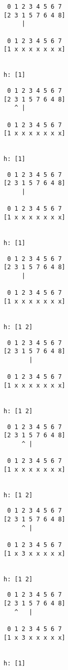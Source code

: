 { \begin{verbatim}
 0 1 2 3 4 5 6 7
[2 3 1 5 7 6 4 8]
     |

 0 1 2 3 4 5 6 7
[1 x x x x x x x]


h: [1]
\end{verbatim} }

{ \begin{verbatim}
 0 1 2 3 4 5 6 7
[2 3 1 5 7 6 4 8]
   ^ |

 0 1 2 3 4 5 6 7
[1 x x x x x x x]


h: [1]
\end{verbatim} }

{ \begin{verbatim}
 0 1 2 3 4 5 6 7
[2 3 1 5 7 6 4 8]
     |

 0 1 2 3 4 5 6 7
[1 x x x x x x x]


h: [1]
\end{verbatim} }

{ \begin{verbatim}
 0 1 2 3 4 5 6 7
[2 3 1 5 7 6 4 8]
     |

 0 1 2 3 4 5 6 7
[1 x x x x x x x]


h: [1 2]
\end{verbatim} }

{ \begin{verbatim}
 0 1 2 3 4 5 6 7
[2 3 1 5 7 6 4 8]
       |

 0 1 2 3 4 5 6 7
[1 x x x x x x x]


h: [1 2]
\end{verbatim} }

{ \begin{verbatim}
 0 1 2 3 4 5 6 7
[2 3 1 5 7 6 4 8]
     ^ |

 0 1 2 3 4 5 6 7
[1 x x x x x x x]


h: [1 2]
\end{verbatim} }

{ \begin{verbatim}
 0 1 2 3 4 5 6 7
[2 3 1 5 7 6 4 8]
     ^ |

 0 1 2 3 4 5 6 7
[1 x 3 x x x x x]


h: [1 2]
\end{verbatim} }

{ \begin{verbatim}
 0 1 2 3 4 5 6 7
[2 3 1 5 7 6 4 8]
   ^   |

 0 1 2 3 4 5 6 7
[1 x 3 x x x x x]


h: [1]
\end{verbatim} }

